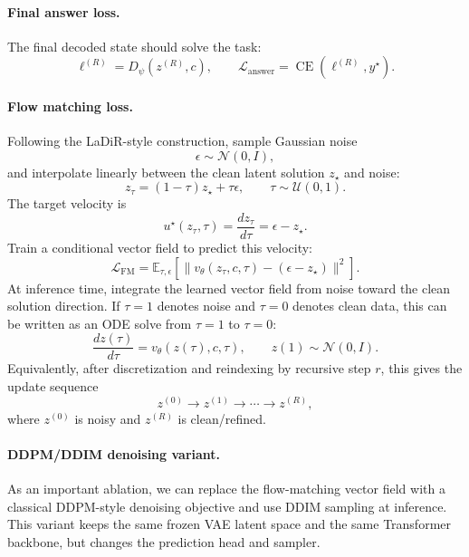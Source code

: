\documentclass[11pt]{article}
\begin{document}
\paragraph{Final answer loss.}
The final decoded state should solve the task:
\[
    \ell^{(R)}=D_\psi(z^{(R)},c),
    \qquad
    \mathcal L_{\mathrm{answer}}
    =
    \operatorname{CE}(\ell^{(R)},y^\star).
\]

\paragraph{Flow matching loss.}
Following the LaDiR-style construction, sample Gaussian noise
\[
    \epsilon\sim\mathcal N(0,I),
\]
and interpolate linearly between the clean latent solution \(z_\star\) and noise:
\[
    z_\tau=(1-\tau)z_\star+\tau\epsilon,
    \qquad
    \tau\sim\mathcal U(0,1).
\]
The target velocity is
\[
    u^\star(z_\tau,\tau)
    =
    \frac{d z_\tau}{d\tau}
    =
    \epsilon-z_\star.
\]
Train a conditional vector field to predict this velocity:
\[
    \mathcal L_{\mathrm{FM}}
    =
    \mathbb E_{\tau,\epsilon}
    \left[
        \|v_\theta(z_\tau,c,\tau)-(\epsilon-z_\star)\|^2
    \right].
\]
At inference time, integrate the learned vector field from noise toward the clean solution direction. If \(\tau=1\) denotes noise and \(\tau=0\) denotes clean data, this can be written as an ODE solve from \(\tau=1\) to \(\tau=0\):
\[
    \frac{d z(\tau)}{d\tau}
    =
    v_\theta(z(\tau),c,\tau),
    \qquad
    z(1)\sim\mathcal N(0,I).
\]
Equivalently, after discretization and reindexing by recursive step \(r\), this gives the update sequence
\[
    z^{(0)}\rightarrow z^{(1)}\rightarrow\cdots\rightarrow z^{(R)},
\]
where \(z^{(0)}\) is noisy and \(z^{(R)}\) is clean/refined.

\paragraph{DDPM/DDIM denoising variant.}
As an important ablation, we can replace the flow-matching vector field with a classical DDPM-style denoising objective and use DDIM sampling at inference. This variant keeps the same frozen VAE latent space and the same Transformer backbone, but changes the prediction head and sampler.
\end{document}
